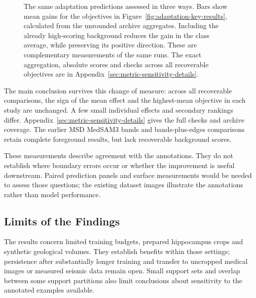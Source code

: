 \documentclass[12pt,a4paper]{article}
\begin{document}
\begin{figure}[htbp]
\caption{The same adaptation
predictions assessed in three ways. Bars show mean gains for the objectives
in Figure~\ref{fig:adaptation-key-results}, calculated from the unrounded
archive aggregates. Including the already high-scoring background reduces
the gain in the class average, while preserving its positive direction.
These are complementary measurements of the same runs. The exact
aggregation, absolute scores and checks across all recoverable objectives
are in Appendix~\ref{sec:metric-sensitivity-details}.}
\label{fig:metric-sensitivity-key-results}
\end{figure}

The main conclusion survives this change of measure: across all recoverable
comparisons, the sign of the mean effect and the highest-mean objective
in each study are unchanged. A few small individual effects and secondary
rankings differ. Appendix~\ref{sec:metric-sensitivity-details} gives the
full checks and archive coverage. The earlier MSD MedSAM3 bands and
bands-plus-edges comparisons retain complete foreground results, but lack
recoverable background scores.

These measurements describe agreement with the annotations. They do not
establish where boundary errors occur or whether the improvement is
useful downstream. Paired prediction panels and surface measurements
would be needed to assess those questions; the existing dataset images
illustrate the annotations rather than model performance.

\FloatBarrier
\subsection{Limits of the Findings}
\label{sec:limitations}\label{sec:experimental-limitations}

The results concern limited training budgets, prepared hippocampus crops
and synthetic geological volumes. They establish benefits within those
settings; persistence after substantially longer training and transfer
to uncropped medical images or measured seismic data remain open.
Small support sets and overlap between some support partitions also
limit conclusions about sensitivity to the annotated examples available.
\end{document}
